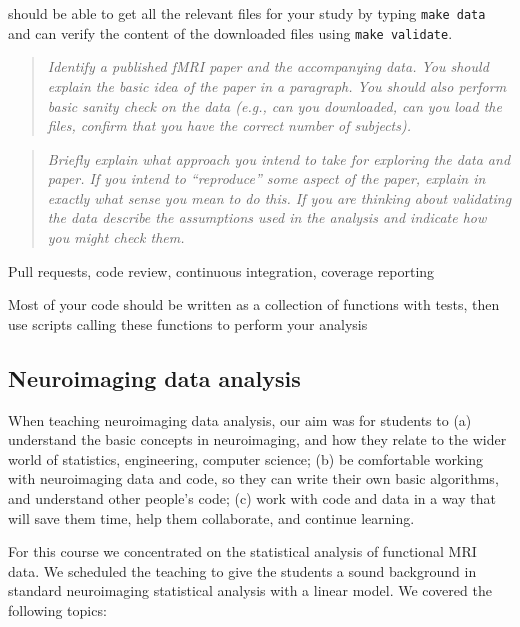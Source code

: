 should be able to get all the relevant files for your study by typing \texttt{make data} and
can verify the content of the downloaded files using \texttt{make validate}.


\begin{quote}\emph{
Identify a published fMRI paper and the accompanying data.
You should explain the basic idea of the paper in a paragraph.
You should also perform basic sanity check on the data
(e.g., can you downloaded, can you load the files, confirm that you have the
correct number of subjects).
}\end{quote}

\begin{quote}\emph{
Briefly explain what approach you intend to take for exploring
the data and paper.  If you intend to ``reproduce'' some aspect of the paper,
explain in exactly what sense you mean to do this.  If you are thinking about
validating the data describe the assumptions used in the analysis and indicate
how you might check them.
}\end{quote}

Pull requests, code review, continuous integration, coverage reporting

Most of your code should be written as a collection of functions with tests,
then use scripts calling these functions to perform your analysis




\subsection{Neuroimaging data analysis}\label{analysis}

When teaching neuroimaging data analysis, our aim was for students to
(a) understand the basic concepts in neuroimaging,
and how they relate to the wider world of statistics, engineering, computer science;
(b) be comfortable working with neuroimaging data and code, so they can write
their own basic algorithms, and understand other people's code;
(c) work with code and data in a way that will save them time, help them collaborate,
and continue learning.%

For this course we concentrated on the statistical analysis of functional MRI
data.  We scheduled the teaching to give the students a sound background in
standard neuroimaging statistical analysis with a linear model.  We covered
the following topics:

